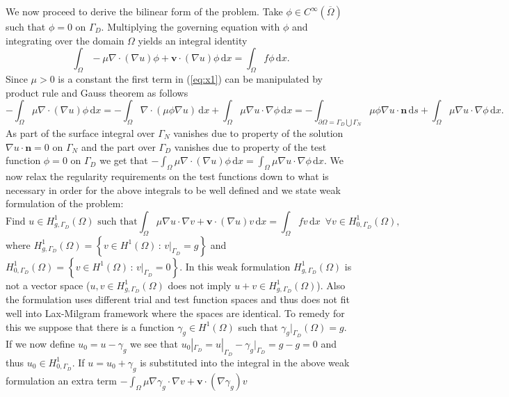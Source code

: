 \documentclass[a4paper,11pt,titlepage]{article}
\newcommand{\VEC}[1]{\ensuremath{\textbf{#1}}}
\begin{document}
We now proceed to derive the bilinear form of the problem. Take $\phi\in C^{\infty}(\overline{\Omega})$ such that $\phi=0$ on $\Gamma_D$. Multiplying the governing equation with $\phi$
and integrating over the domain $\Omega$ yields an integral identity
\begin{equation}
\label{eq:x1}
\int_\Omega -\mu\nabla\cdot(\nabla u)\phi+\VEC{v}\cdot(\nabla u)\phi\,\mathrm{d}x = \int_\Omega f \phi\,\mathrm{d}x.
\end{equation}
Since $\mu>0$ is a constant the first term in (\ref{eq:x1}) can be manipulated by product rule and Gauss theorem as follows
\[
-\int_\Omega \mu\nabla\cdot(\nabla u)\phi \,\mathrm{d}x = -\int_\Omega \nabla\cdot(\mu\phi\nabla u)\,\mathrm{d}x + \int_\Omega \mu\nabla u\cdot \nabla\phi \,\mathrm{d}x
=-\int_{\partial\Omega=\Gamma_D\bigcup\Gamma_N} \mu\phi\nabla u\cdot\VEC{n}\,\mathrm{d}s + \int_\Omega \mu\nabla u\cdot \nabla\phi \,\mathrm{d}x.
\]
As part of the surface integral over $\Gamma_N$ vanishes due to property of the solution $\nabla u\cdot\VEC{n}=0$ on $\Gamma_N$ and the part over 
$\Gamma_D$ vanishes due to property of the test function $\phi=0$ on $\Gamma_D$ we get that $-\int_\Omega \mu\nabla\cdot(\nabla u)\phi \,\mathrm{d}x = 
\int_\Omega \mu\nabla u\cdot \nabla\phi \,\mathrm{d}x$. We now relax the regularity requirements on the test functions down to what is necessary in order
for the above integrals to be well defined and we state weak formulation of the problem:
\begin{equation*}
\text{Find } u\in H^1_{g,\Gamma_D}(\Omega)\text{ such that}
\int_\Omega \mu\nabla u\cdot \nabla v + \VEC{v}\cdot(\nabla u)v \,\mathrm{d}x= \int_\Omega f v \,\mathrm{d}x\,\,\,\forall v\in H^1_{0,\Gamma_D}(\Omega),
\end{equation*}
where $H^1_{g,\Gamma_D}(\Omega)=\left\{v\in H^1(\Omega)\,:\,v|_{\Gamma_D}=g\right\}$ and 
$H^1_{0,\Gamma_D}(\Omega)=\left\{v\in H^1(\Omega)\,:\,v|_{\Gamma_D}=0\right\}$. In this weak formulation $H^1_{g,\Gamma_D}(\Omega)$ is not a vector space
($u,v\in H^1_{g,\Gamma_D}(\Omega)$ does not imply $u+v\in H^1_{g,\Gamma_D}(\Omega)$). Also the formulation uses  different trial and test function spaces and thus
does not fit well into Lax-Milgram framework where the spaces are identical. To remedy for this we suppose that there is a function $\gamma_g\in H^1(\Omega)$ such 
that $\gamma_g|_{\Gamma_D}(\Omega)=g$. If we now define $u_0=u-\gamma_g$ we see that $u_0|_{\Gamma_D}=u|_{\Gamma_D}-\gamma_g|_{\Gamma_D}=g-g=0$ and thus $u_0\in H^1_{0,\Gamma_D}$.
If $u=u_0+\gamma_g$ is substituted into the integral in the above weak formulation an extra term $-\int_\Omega \mu\nabla \gamma_g\cdot \nabla v + \VEC{v}\cdot(\nabla \gamma_g)v$
\end{document}
